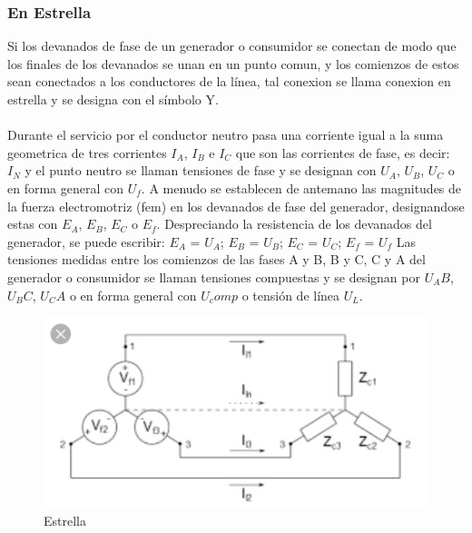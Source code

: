 \documentclass[11pt]{article}
\begin{document}
\subsubsection{En Estrella}
Si los devanados de fase de un generador o consumidor se conectan de modo que los finales de los devanados se unan en un punto comun, y los comienzos de estos sean conectados a los conductores de la línea, tal conexion se llama conexion en estrella y se designa con el símbolo Y.\\\\
Durante el servicio por el conductor neutro pasa una corriente igual a la suma geometrica de tres corrientes $I_A$, $I_B$ e $I_C$ que son las corrientes de fase, es decir: $I_N$ y el punto neutro se llaman tensiones de fase y se designan con $U_A$, $U_B$, $U_C$ o en forma general con $U_f$. A menudo se establecen de antemano las magnitudes de la fuerza electromotriz (fem) en los devanados de fase del generador, designandose estas con $E_A$, $E_B$, $E_C$ o $E_f$. Despreciando la resistencia de los devanados del generador, se puede escribir: $E_A$ = $U_A$; $E_B$ = $U_B$; $E_C$ = $U_C$; $E_f$ = $U_f$ Las tensiones medidas entre los comienzos de las fases A y B, B y C, C y A del generador o consumidor se llaman tensiones compuestas y se designan por $U_AB$, $U_BC$, $U_CA$ o en forma general con $U_comp$ o tensión de línea $U_L$.
\begin{center}
\begin{figure}[htp]
\centering
\includegraphics[scale=0.70]{Circuito Estrella.png}
\caption{Estrella}
\label{}
\end{figure}
\end{center}
\end{document}
